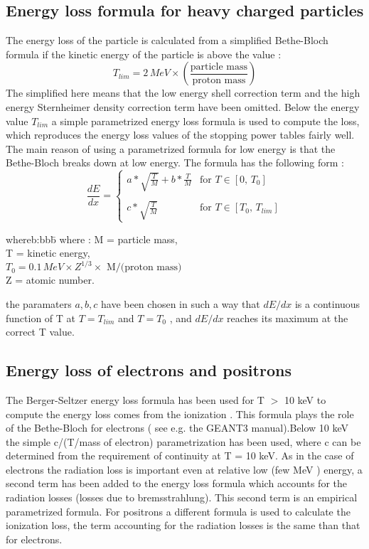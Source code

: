     \subsection{Energy loss formula for heavy charged particles}
     The energy loss of the particle is calculated from a simplified Bethe-Bloch
     formula if the kinetic energy of the particle is above the value :
     \[
     T_{lim}=2 \,MeV \times \left( \frac { \mbox{particle mass}}{\mbox{proton mass}} \right)
     \]
     The simplified here means that the low energy shell correction term and
     the high energy Sternheimer density correction term have been omitted.
     Below the energy value $T_{lim}$ a simple parametrized energy loss formula
     is used to compute the loss, which reproduces the energy loss values
     of the stopping power tables fairly well. The main reason of using a
     parametrized formula for low energy is that the Bethe-Bloch breaks down
     at low energy. The formula has the following form :
     \[
    \frac{dE}{dx} = \left \{ \begin{array}{ll}
                   a*\sqrt{\frac{T}{M}}+b*\frac{T}{M} & \mbox{for $T \in [0, \, T_0]$}
                   \\ \\
                   c*\sqrt{\frac{T}{M}} & \mbox{for $T \in [T_0, \, T_{lim}]$} 
                      \end{array}
            \right.
     \]
   \begin{tabbing}
      whereb:bbb\= \kill
      where :  \> M = particle mass, \\
               \> T = kinetic energy, \\
               \> $ T_0=0.1 \, MeV \times Z^{1/3} \times \mbox{ M/(proton mass)} $\\
               \> Z = atomic number.
    \end{tabbing}
     the paramaters $a,b,c$ have been chosen in such a way that $dE/dx$ is a
     continuous function of T at $T=T_{lim}$ and $T=T_0$ , and $dE/dx$ reaches its maximum
     at the correct T value.

    \subsection{Energy loss of electrons and positrons}
     The Berger-Seltzer energy loss formula has been used for T $>$ 10 keV to
     compute the energy loss comes from the ionization . This formula plays the
     role of the Bethe-Bloch for electrons ( see e.g. the GEANT3 manual).Below
     10 keV the simple c/(T/mass of electron) parametrization has been used,
     where c can be determined from the requirement of continuity at T = 10 keV.
     As in the case of electrons the radiation loss is important even at 
     relative low (few MeV ) energy, a second term has been added to the
     energy loss formula which accounts for the radiation losses (losses due to
     bremsstrahlung). This second term is an empirical parametrized formula.
     For positrons a different formula is used to calculate the ionization
     loss, the term accounting for the radiation losses is the same than that
     for electrons.

